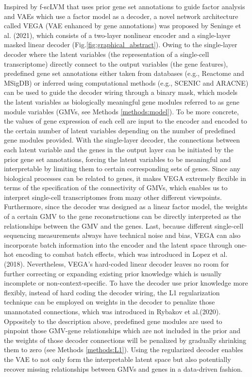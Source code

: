 Inspired by f-scLVM\cite{Buettner2017} that uses prior gene set annotations to guide factor analysis and VAEs which use a factor model as a decoder\cite{Svensson2020}, a novel network architecture called VEGA (VAE enhanced by gene annotations) was proposed by Seninge et al. (2021), which consists of a two-layer nonlinear encoder and a single-layer masked linear decoder (Fig.\ref{fig:graphical_abstract}). Owing to the single-layer decoder where the latent variables (the representation of a single-cell transcriptome) directly connect to the output variables (the gene features), predefined gene set annotations either taken from databases (e.g., Reactome\cite{Gillespie2022} and MSigDB\cite{Liberzon2015}) or inferred using computational methods (e.g., SCENIC\cite{Aibar2017} and ARACNE\cite{Margolin2006}) can be used to guide the decoder wiring through a binary mask, which models the latent variables as biologically meaningful gene modules referred to as gene module variables (GMVs, see Methods \ref{methods:model}). To be more concrete, the values of gene expression of each cell are input to the encoder and encoded to the certain number of latent variables depending on the number of predefined gene modules provided. With the single-layer decoder, the connections between each latent variable and the genes in the output layer can be initiated by the prior gene set annotations, forcing the latent variables to be meaningful and interpretable by limiting them to certain corresponding sets of genes. Since any biological processes can be related to genes, it makes VEGA extremely flexible in terms of the specification of the connectivity of GMVs, which enables us to interpret single-cell transcriptomes from many other different viewpoints. Furthermore, since the decoder was designed as a linear factor model, the weights of a certain GMV to the gene reconstructions can be directly interpreted as the relationships between the GMV and the genes. Last, because different single-cell sequencing measurements always have technical noise and bias, VEGA can also incorporate batch information into the encoder and the latent space through one-hot encoding to combat batch effects, which was introduced in Lopez et al. (2018). Nevertheless, VEGA's hard-coded linear decoder leaves no room for further correcting or expanding existing prior knowledge which is usually incomplete or non-context-specific\cite{Seninge2021}. To have the decoder use prior knowledge more flexibly, instead of hard coding the decoder wiring, the L1 regularization technique\cite{Ng2004} can be employed on weights in the decoder to penalize those unannotated connections, which was introduced in Rybakov et al.(2020). Oppositely to the description above, predefined gene modules are used to pinpoint those GMV-gene relationships which are not included in the prior and the weights of those decoder connections will be penalized by gradually shrinking them to zero (see Methods \ref{methods:L1}). Using the regularized decoder enables the VAE to not only form the interpretable latent space but also potentially recover missing relationships between GMVs and genes in a data-driven fashion.\vspace{2mm}

